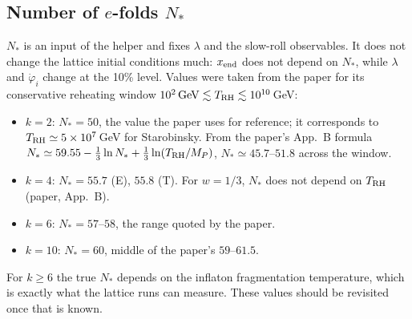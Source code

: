 \documentclass[11pt,a4paper]{article}
\newcommand{\MP}{M_P}
\begin{document}
\subsection{Number of $e$-folds $N_*$}
$N_*$ is an input of the helper and fixes $\lambda$ and the slow-roll observables. It does not change the lattice initial conditions much: $x_{\rm end}$ does not depend on $N_*$, while $\lambda$ and $\dot\varphi_i$ change at the 10\% level. Values were taken from the paper for its conservative reheating window $10^2\,\text{GeV}\lesssim T_{\rm RH}\lesssim10^{10}$\,GeV:
\begin{itemize}
\item $k=2$: $N_*=50$, the value the paper uses for reference; it corresponds to $T_{\rm RH}\simeq5\times10^7$\,GeV for Starobinsky. From the paper's App.~B formula $N_*\simeq59.55-\tfrac13\ln N_*+\tfrac13\ln(T_{\rm RH}/\MP)$, $N_*\simeq45.7$--$51.8$ across the window.
\item $k=4$: $N_*=55.7$ (E), $55.8$ (T). For $w=1/3$, $N_*$ does not depend on $T_{\rm RH}$ (paper, App.~B).
\item $k=6$: $N_*=57$--$58$, the range quoted by the paper.
\item $k=10$: $N_*=60$, middle of the paper's $59$--$61.5$.
\end{itemize}
For $k\ge6$ the true $N_*$ depends on the inflaton fragmentation temperature, which is exactly what the lattice runs can measure. These values should be revisited once that is known.
\end{document}
